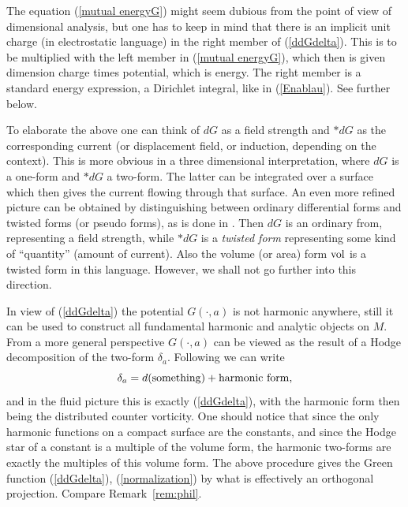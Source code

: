\documentclass[reqno,12pt]{article}
\theoremstyle{plain}
\theoremstyle{definition}
\numberwithin{equation}{section}
\numberwithin{figure}{section}
\begin{document}
The equation (\ref{mutual energyG}) might seem dubious from the point of view of dimensional analysis, but one has to 
keep in mind that there is an implicit unit charge (in electrostatic language) in the right member of (\ref{ddGdelta}).
This is to be multiplied with the left member in (\ref{mutual energyG}), which then is given dimension
charge times potential, which is energy. 
The right member is a standard energy expression, a Dirichlet integral, like in (\ref{Enablau}). See further below. 

To elaborate the above one can think of $dG$ as a field strength and $*dG$ as the corresponding current (or displacement field,
or induction, depending on the context).  This is more obvious in a three dimensional interpretation, where $dG$ is a
one-form and $*dG$ a two-form. The latter can be integrated over a surface which then gives the current flowing through
that surface. An even more refined picture can be obtained by distinguishing between ordinary differential forms and {twisted forms}
(or pseudo forms), as is done in \cite{Burke-1983, Burke-1985, Frankel-2012}.  Then $dG$ is an ordinary from,
representing a field strength, while $*dG$ is a {\it twisted form} representing some kind of ``quantity'' (amount of current). 
Also the volume (or area) form ${\rm vol}$ is a twisted form in this language. However, we shall not go further into this direction.
 
In view of (\ref{ddGdelta}) the potential $G(\cdot,a)$ is not harmonic anywhere, still it can be used to construct
all fundamental harmonic and analytic objects on $M$.
From a more general perspective $G(\cdot,a)$ can be viewed as the result of a Hodge decomposition of the two-form $\delta_a$.
Following \cite{Gustafsson-2022a, Grotta-Ragazzo-Gustafsson-Koiller-2024} we can write
\begin{equation}\label{Hodgedeltaa}
\delta_a= d({\rm something})+{\rm harmonic \ form},
\end{equation}
and in the fluid picture this is exactly (\ref{ddGdelta}), with the harmonic form then being the distributed counter vorticity. 
One should notice that since the only harmonic functions on a compact surface are the constants, and since the Hodge star
of a constant is a multiple of the volume form, the harmonic two-forms are exactly the multiples of this volume form.
The above procedure gives the Green function  (\ref{ddGdelta}), (\ref{normalization})
by what is effectively an orthogonal projection. Compare Remark~\ref{rem:phil}.
\end{document}
